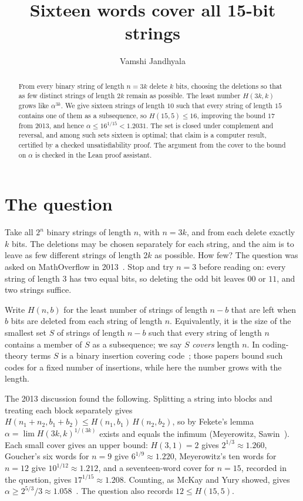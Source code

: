 \documentclass[11pt]{article}
\title{Sixteen words cover all 15-bit strings}
\author{Vamshi Jandhyala}
\date{}
\theoremstyle{remark}
\begin{document}
\maketitle
\vspace{-2em}

\begin{abstract}
From every binary string of length $n=3k$ delete $k$ bits, choosing the deletions so that as few distinct
strings of length $2k$ remain as possible. The least number $H(3k,k)$ grows like $\alpha^{3k}$. We give sixteen
strings of length $10$ such that every string of length $15$ contains one of them as a subsequence, so
$H(15,5)\le16$, improving the bound $17$ from 2013, and hence $\alpha\le16^{1/15}<1.2031$. The set is closed
under complement and reversal, and among such sets sixteen is optimal; that claim is a computer result, certified
by a checked unsatisfiability proof. The argument from the cover to the bound on $\alpha$ is checked in the Lean
proof assistant.
\end{abstract}

\section{The question}

Take all $2^n$ binary strings of length $n$, with $n=3k$, and from each delete exactly $k$ bits. The deletions
may be chosen separately for each string, and the aim is to leave as few different strings of length $2k$ as
possible. How few? The question was asked on MathOverflow in 2013~\cite{MO}. Stop and try $n=3$ before reading
on: every string of length 3 has two equal bits, so deleting the odd bit leaves $00$ or $11$, and two strings
suffice.

Write $H(n,b)$ for the least number of strings of length $n-b$ that are left when $b$ bits are deleted from
each string of length $n$. Equivalently, it is the size of the smallest set $S$ of strings of length $n-b$ such
that every string of length $n$ contains a member of $S$ as a subsequence; we say $S$ \emph{covers} length $n$.
In coding-theory terms $S$ is a binary insertion covering code~\cite{LRSY21,XSG26}; those papers bound such
codes for a fixed number of insertions, while here the number grows with the length.

The 2013 discussion found the following. Splitting a string into blocks and treating each block separately
gives $H(n_1+n_2,b_1+b_2)\le H(n_1,b_1)\,H(n_2,b_2)$, so by Fekete's lemma
$\alpha=\lim H(3k,k)^{1/(3k)}$ exists and equals the infimum (Meyerowitz, Sawin~\cite{MO}). Each small cover gives an upper bound:
$H(3,1)=2$ gives $2^{1/3}\approx1.260$, Goucher's six words for $n=9$ give $6^{1/9}\approx1.220$, Meyerowitz's
ten words for $n=12$ give $10^{1/12}\approx1.212$, and a seventeen-word cover for $n=15$, recorded in the
question, gives $17^{1/15}\approx1.208$. Counting, as McKay and Yury showed, gives
$\alpha\ge2^{5/3}/3\approx1.058$~\cite{MO}. The question also records $12\le H(15,5)$.
\end{document}
